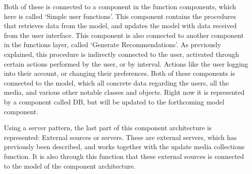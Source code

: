 Both of these is connected to a component in the function components, which here is called ‘Simple user functions’. This component contains the procedures that retrieves data from the model, and updates the model with data received from the user interface. This component is also connected to another component in the functions layer, called ‘Generate Recommendations’. As previously explained, this procedure is indirectly connected to the user, activated through certain actions performed by the user, or by interval. Actions like the user logging into their account, or changing their preferences.
Both of these components is connected to the model, which all concrete data regarding the users, all the media, and various other notable classes and objects. Right now it is represented by a component called DB, but will be updated to the forthcoming model component.

Using a server pattern, the last part of this component architecture is represented: External sources or servers. These are external servers, which has previously been described, and works together with the update media collections function. It is also through this function that these external sources is connected to the model of the component architecture.